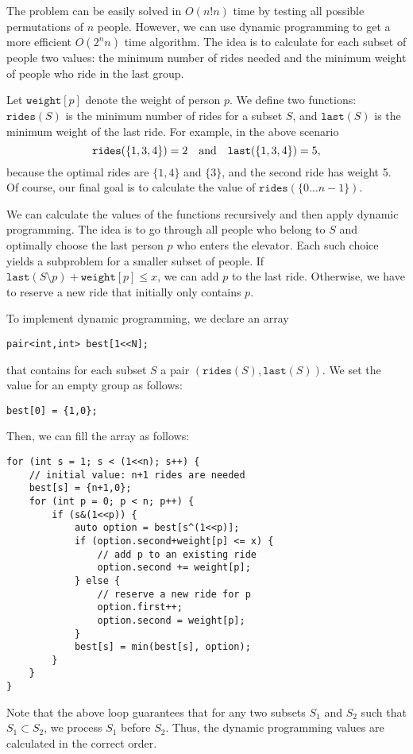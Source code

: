 The problem can be easily solved in $O(n! n)$ time
by testing all possible permutations of $n$ people.
However, we can use dynamic programming to get
a more efficient $O(2^n n)$ time algorithm.
The idea is to calculate for each subset of people
two values: the minimum number of rides needed and
the minimum weight of people who ride in the last group.

Let $\texttt{weight}[p]$ denote the weight of
person $p$.
We define two functions:
$\texttt{rides}(S)$ is the minimum number of
rides for a subset $S$,
and $\texttt{last}(S)$ is the minimum weight
of the last ride.
For example, in the above scenario
\[ \texttt{rides}(\{1,3,4\})=2 \hspace{10px} \textrm{and}
\hspace{10px} \texttt{last}(\{1,3,4\})=5,\]
because the optimal rides are $\{1,4\}$ and $\{3\}$,
and the second ride has weight 5.
Of course, our final goal is to calculate the value
of $\texttt{rides}(\{0 \ldots n-1\})$.

We can calculate the values
of the functions recursively and then apply
dynamic programming.
The idea is to go through all people
who belong to $S$ and optimally
choose the last person $p$ who enters the elevator.
Each such choice yields a subproblem
for a smaller subset of people.
If $\texttt{last}(S \setminus p)+\texttt{weight}[p] \le x$,
we can add $p$ to the last ride.
Otherwise, we have to reserve a new ride
that initially only contains $p$.

To implement dynamic programming,
we declare an array
\begin{lstlisting}
pair<int,int> best[1<<N];
\end{lstlisting}
that contains for each subset $S$
a pair $(\texttt{rides}(S),\texttt{last}(S))$.
We set the value for an empty group as follows:
\begin{lstlisting}
best[0] = {1,0};
\end{lstlisting}
Then, we can fill the array as follows:

\begin{lstlisting}
for (int s = 1; s < (1<<n); s++) {
    // initial value: n+1 rides are needed
    best[s] = {n+1,0};
    for (int p = 0; p < n; p++) {
        if (s&(1<<p)) {
            auto option = best[s^(1<<p)];
            if (option.second+weight[p] <= x) {
                // add p to an existing ride
                option.second += weight[p];
            } else {
                // reserve a new ride for p
                option.first++;
                option.second = weight[p];
            }
            best[s] = min(best[s], option);
        }
    }
}
\end{lstlisting}
Note that the above loop guarantees that
for any two subsets $S_1$ and $S_2$
such that $S_1 \subset S_2$, we process $S_1$ before $S_2$.
Thus, the dynamic programming values are calculated in the
correct order.

